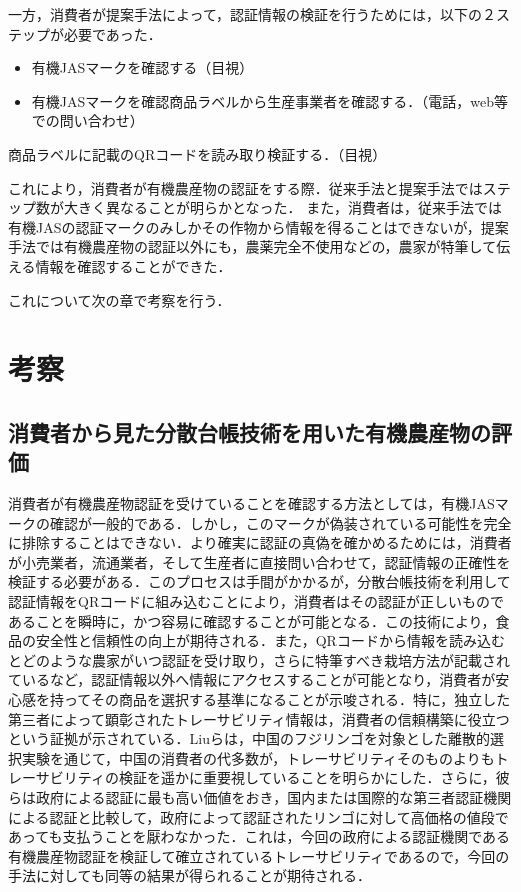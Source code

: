 \documentclass[11pt,dvipdfmx]{jreport}
\begin{document}
一方，消費者が提案手法によって，認証情報の検証を行うためには，以下の２ステップが必要であった．
\begin{itemize}
  \item 有機JASマークを確認する（目視）
  \item 有機JASマークを確認商品ラベルから生産事業者を確認する．（電話，web等での問い合わせ）
\end{itemize}商品ラベルに記載のQRコードを読み取り検証する．（目視）

これにより，消費者が有機農産物の認証をする際．従来手法と提案手法ではステップ数が大きく異なることが明らかとなった．
また，消費者は，従来手法では有機JASの認証マークのみしかその作物から情報を得ることはできないが，提案手法では有機農産物の認証以外にも，農薬完全不使用などの，農家が特筆して伝える情報を確認することができた．

これについて次の章で考察を行う．

\chapter{考察}
\section{消費者から見た分散台帳技術を用いた有機農産物の評価}

消費者が有機農産物認証を受けていることを確認する方法としては，有機JASマークの確認が一般的である．しかし，このマークが偽装されている可能性を完全に排除することはできない．より確実に認証の真偽を確かめるためには，消費者が小売業者，流通業者，そして生産者に直接問い合わせて，認証情報の正確性を検証する必要がある．このプロセスは手間がかかるが，分散台帳技術を利用して認証情報をQRコードに組み込むことにより，消費者はその認証が正しいものであることを瞬時に，かつ容易に確認することが可能となる．この技術により，食品の安全性と信頼性の向上が期待される．また，QRコードから情報を読み込むとどのような農家がいつ認証を受け取り，さらに特筆すべき栽培方法が記載されているなど，認証情報以外へ情報にアクセスすることが可能となり，消費者が安心感を持ってその商品を選択する基準になることが示唆される．特に，独立した第三者によって顕彰されたトレーサビリティ情報は，消費者の信頼構築に役立つという証拠が示されている\cite{ringo}．Liuらは，中国のフジリンゴを対象とした離散的選択実験を通じて，中国の消費者の代多数が，トレーサビリティそのものよりもトレーサビリティの検証を遥かに重要視していることを明らかにした\cite{ringo}．さらに，彼らは政府による認証に最も高い価値をおき，国内または国際的な第三者認証機関による認証と比較して，政府によって認証されたリンゴに対して高価格の値段であっても支払うことを厭わなかった．これは，今回の政府による認証機関である有機農産物認証を検証して確立されているトレーサビリティであるので，今回の手法に対しても同等の結果が得られることが期待される．
\end{document}
